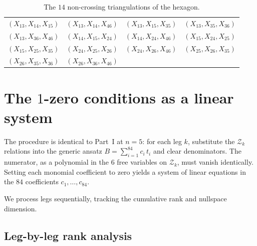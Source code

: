 \documentclass[11pt]{article}
\theoremstyle{plain}
\theoremstyle{definition}
\newcommand{\cZ}{\mathcal{Z}}
\begin{document}
\begin{table}[ht]
\centering
\small
\begin{tabular}{llll}
\toprule
$(X_{13}, X_{14}, X_{15})$ & $(X_{13}, X_{14}, X_{46})$ &
$(X_{13}, X_{15}, X_{35})$ & $(X_{13}, X_{35}, X_{36})$ \\
$(X_{13}, X_{36}, X_{46})$ & $(X_{14}, X_{15}, X_{24})$ &
$(X_{14}, X_{24}, X_{46})$ & $(X_{15}, X_{24}, X_{25})$ \\
$(X_{15}, X_{25}, X_{35})$ & $(X_{24}, X_{25}, X_{26})$ &
$(X_{24}, X_{26}, X_{46})$ & $(X_{25}, X_{26}, X_{35})$ \\
$(X_{26}, X_{35}, X_{36})$ & $(X_{26}, X_{36}, X_{46})$ & & \\
\bottomrule
\end{tabular}
\caption{The $14$ non-crossing triangulations of the hexagon.}
\label{tab:tri6}
\end{table}

\section{The $1$-zero conditions as a linear system}

The procedure is identical to Part~I at $n=5$: for each leg $k$, substitute the
$\cZ_k$ relations into the generic ansatz $B = \sum_{i=1}^{84} c_i\, t_i$ and clear
denominators. The numerator, as a polynomial in the $6$ free variables on $\cZ_k$,
must vanish identically. Setting each monomial coefficient to zero yields a system
of linear equations in the $84$ coefficients $c_1, \ldots, c_{84}$.

We process legs sequentially, tracking the cumulative rank and nullspace dimension.

\subsection{Leg-by-leg rank analysis}
\end{document}
